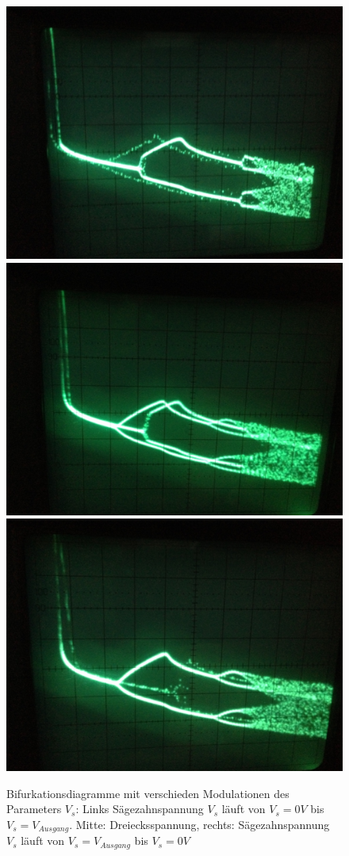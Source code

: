 \documentclass[11,5pt, twoside]{article}
\begin{document}
\begin{figure}[!htbp]
\centering
\includegraphics[scale=0.12]{bif-ldr/dreieck_1}
\includegraphics[scale=0.12]{bif-ldr/dreieck_2}
\includegraphics[scale=0.12]{bif-ldr/dreieck_3}
\caption{Bifurkationsdiagramme mit verschieden Modulationen des Parameters $V_s$: Links Sägezahnspannung $V_s$ läuft von $V_s=0V$ bis $V_s=V_{Ausgang}$. Mitte: Dreiecksspannung, rechts: Sägezahnspannung $V_s$ läuft von $V_s=V_{Ausgang}$ bis $V_s=0V$}
\label{fig:ldr-modellierung}
\end{figure}
\end{document}

